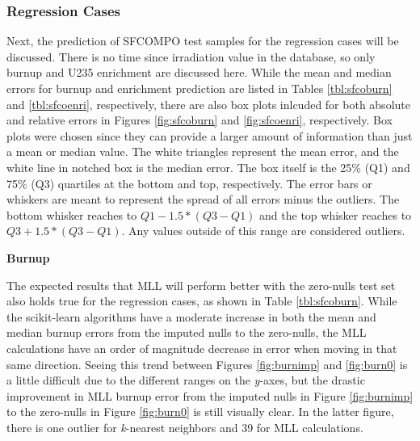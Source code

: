 \subsubsection{Regression Cases}

Next, the prediction of \gls{SFCOMPO} test samples for the regression cases
will be discussed. There is no time since irradiation value in the database, so
only burnup and \gls{U235} enrichment are discussed here.  While the mean and
median errors for burnup and enrichment prediction are listed in Tables
\ref{tbl:sfcoburn} and \ref{tbl:sfcoenri}, respectively, there are also box
plots inlcuded for both absolute and relative errors in Figures
\ref{fig:sfcoburn} and \ref{fig:sfcoenri}, respectively.  Box plots were chosen
since they can provide a larger amount of information than just a mean or
median value.  The white triangles represent the mean error, and the white line
in notched box is the median error. The box itself is the 25\% (Q1) and 75\%
(Q3) quartiles at the bottom and top, respectively. The error bars or whiskers
are meant to represent the spread of all errors minus the outliers.  The bottom
whisker reaches to $Q1 - 1.5*(Q3-Q1)$ and the top whisker reaches to $Q3 +
1.5*(Q3-Q1)$. Any values outside of this range are considered outliers.
\cite{matplotlib}

\noindent \textbf{Burnup}

The expected results that \gls{MLL} will perform better with the zero-nulls
test set also holds true for the regression cases, as shown in Table
\ref{tbl:sfcoburn}.  While the scikit-learn algorithms have a moderate increase
in both the mean and median burnup errors from the imputed nulls to the
zero-nulls, the \gls{MLL} calculations have an order of magnitude decrease in
error when moving in that same direction.  Seeing this trend between Figures
\ref{fig:burnimp} and \ref{fig:burn0} is a little difficult due to the
different ranges on the \textit{y}-axes, but the drastic improvement in
\gls{MLL} burnup error from the imputed nulls in Figure \ref{fig:burnimp} to
the zero-nulls in Figure \ref{fig:burn0} is still visually clear. In the latter
figure, there is one outlier for \textit{k}-nearest neighbors and 39 for
\gls{MLL} calculations.

